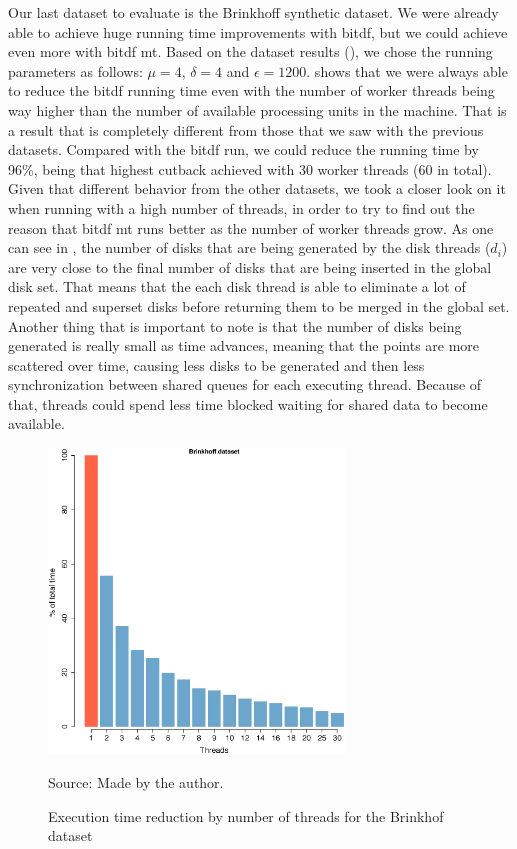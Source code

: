 {Our last dataset to evaluate is the Brinkhoff synthetic dataset. We were already able to achieve huge running time
improvements with \ac{bitdf}, but we could achieve even more with \ac{bitdf} \ac{mt}. Based on the dataset results
(), we chose the running parameters as follows: $\mu=4$, $\delta=4$ and $\epsilon=1200$.
 shows that we were always able to reduce the \ac{bitdf} running time even with the number
of worker threads being way higher than the number of available processing units in the machine. That is a result that
is completely different from those that we saw with the previous datasets. Compared with the \ac{bitdf} run, we could
reduce the running time by 96\%, being that highest cutback achieved with 30 worker threads (60 in total). Given that
different behavior from the other datasets, we took a closer look on it when running with a high number of threads, in
order to try to find out the reason that \ac{bitdf} \ac{mt} runs better as the number of worker threads grow. As one can
see in , the number of disks that are being generated by the disk threads ($d_i$)
are very close to the final number of disks that are being inserted in the global disk set. That means that the each
disk thread is able to eliminate a lot of repeated and superset disks before returning them to be merged in the global
set. Another thing that is important to note is that the number of disks being generated is really small as time
advances, meaning that the points are more scattered over time, causing less disks to be generated and then less
synchronization between shared queues for each executing thread. Because of that, threads could spend less time blocked
waiting for shared data to become available.

\begin{figure}[h!]
    \centering
    \caption{Execution time reduction by number of threads for the Brinkhof dataset}
    \centerline{\includegraphics[width=0.7\textwidth]{images/Brinkhoff_thread.eps}}
    \footnotesize{Source: Made by the author.}
    \label{fig:brinkhoff_threads}
\end{figure}

}
